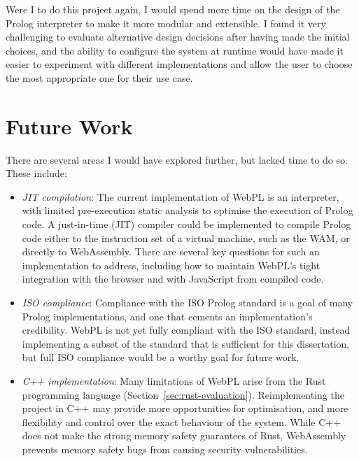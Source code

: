 Were I to do this project again, I would spend more time on the design of the Prolog interpreter to make it more modular and extensible. I found it very challenging to evaluate alternative design decisions after having made the initial choices, and the ability to configure the system at runtime would have made it easier to experiment with different implementations and allow the user to choose the most appropriate one for their use case.

\section{Future Work}

There are several areas I would have explored further, but lacked time to do so. These include:

\begin{itemize}
\item \emph{JIT compilation}: The current implementation of WebPL is an interpreter, with limited pre-execution static analysis to optimise the execution of Prolog code. A just-in-time (JIT) compiler could be implemented to compile Prolog code either to the instruction set of a virtual machine, such as the WAM, or directly to WebAssembly. There are several key questions for such an implementation to address, including how to maintain WebPL's tight integration with the browser and with JavaScript from compiled code.
\item \emph{ISO compliance}: Compliance with the ISO Prolog standard \cite{isoInformationtechnologyProgramming1995} is a goal of many Prolog implementations, and one that cements an implementation's credibility. WebPL is not yet fully compliant with the ISO standard, instead implementing a subset of the standard that is sufficient for this dissertation, but full ISO compliance would be a worthy goal for future work.
\item \emph{C++ implementation}: Many limitations of WebPL arise from the Rust programming language (Section~\ref{sec:rust-evaluation}). Reimplementing the project in C++ may provide more opportunities for optimisation, and more flexibility and control over the exact behaviour of the system. While C++ does not make the strong memory safety guarantees of Rust, WebAssembly prevents memory safety bugs from causing security vulnerabilities.
\end{itemize}